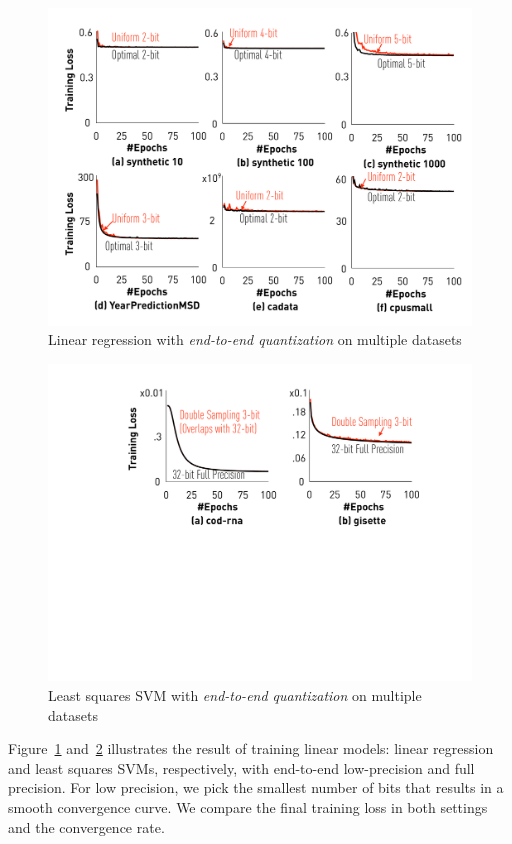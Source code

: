 \documentclass{article}
\begin{document}
\begin{figure}[t]
\centering
    \includegraphics[width=1\columnwidth]{final-experiments/lr-endtoend}
    
\caption{Linear regression with \emph{end-to-end quantization} on multiple datasets}
\label{fig:lr-endtoend}
\end{figure}
\begin{figure}[t]
\centering
    \includegraphics[width=0.6\columnwidth]{final-experiments/lssvm-endtoend}
    
\caption{Least squares SVM with \emph{end-to-end quantization} on multiple datasets}
\label{fig:lssvm-endtoend}
\end{figure}

Figure~\ref{fig:lr-endtoend} and~\ref{fig:lssvm-endtoend} illustrates
the result of training linear models: 
linear regression and least squares SVMs, respectively,
with end-to-end low-precision and 
full precision. For
low precision, we pick the 
smallest number of bits that
results in a smooth convergence
curve. We compare the final 
training loss in both settings 
and the convergence rate.
\end{document}
